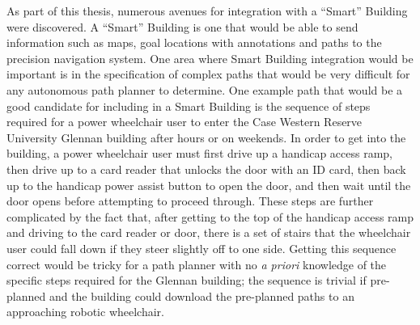 As part of this thesis, numerous avenues for integration with a ``Smart'' Building were discovered. A ``Smart'' Building is one that would be able to send information such as maps, goal locations with annotations and paths to the precision navigation system. One area where Smart Building integration would be important is in the specification of complex paths that would be very difficult for any autonomous path planner to determine. One example path that would be a good candidate for including in a Smart Building is the sequence of steps required for a power wheelchair user to enter the Case Western Reserve University Glennan building after hours or on weekends. In order to get into the building, a power wheelchair user must first drive up a handicap access ramp, then drive up to a card reader that unlocks the door with an ID card, then back up to the handicap power assist button to open the door, and then wait until the door opens before attempting to proceed through. These steps are further complicated by the fact that, after getting to the top of the handicap access ramp and driving to the card reader or door, there is a set of stairs that the wheelchair user could fall down if they steer slightly off to one side. Getting this sequence correct would be tricky for a path planner with no \emph{a priori} knowledge of the specific steps required for the Glennan building; the sequence is trivial if pre-planned and the building could download the pre-planned paths to an approaching robotic wheelchair.

\begin{comment}

Details possible areas to expand on this thesis and improve it's performance on our wheelchair platform

Talk about things where a Smart Building can \emph{definitely} help the precision navigation out. Some are obvious such as goal annotation so that things like ``kitchen'' mean something, but others are less obvious.

One of those would be things that would be tricky, even for a good path planner, such as the approach to get into Glennan from the quad-level.

\end{comment}